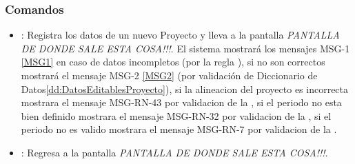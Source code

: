 \subsubsection{Comandos}
\begin{itemize}
 \item {}: Registra los datos de un nuevo Proyecto y lleva a la pantalla \textit{PANTALLA DE DONDE SALE ESTA COSA!!!}.  El sistema mostrará los mensajes MSG-1  \ref{MSG1} en caso de datos incompletos (por la regla ), si no son correctos mostrará el mensaje MSG-2 \ref{MSG2} (por validación de Diccionario de Datos\ref{dd:DatosEditablesProyecto}), si la alineacion del proyecto es incorrecta mostrara el mensaje MSG-RN-43 por validacion de la , si el periodo no esta bien definido mostrara el mensaje MSG-RN-32 por validacion de la , si el periodo no es valido mostrara el mensaje MSG-RN-7 por validacion de la .
 \item {}: Regresa a la pantalla \textit{PANTALLA DE DONDE SALE ESTA COSA!!!}.
\end{itemize}